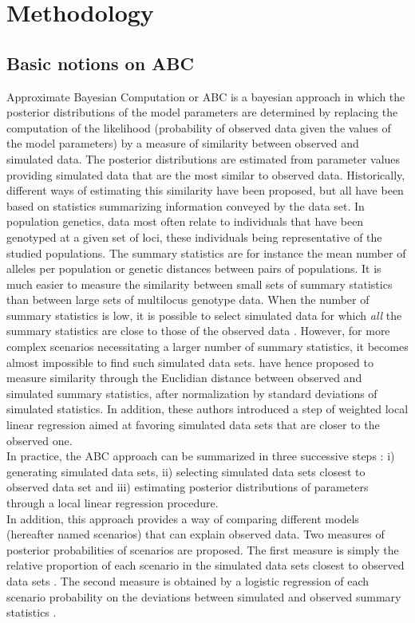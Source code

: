 \section{Methodology}
\subsection{Basic notions on ABC} Approximate Bayesian Computation or
ABC is a bayesian approach in which the posterior distributions of
the model parameters are determined by replacing the computation of
the likelihood (probability of observed data given the values of the
model parameters) by a measure of similarity between observed and
simulated data. The posterior distributions are estimated from
parameter values providing simulated data that are the most similar
to observed data. Historically, different ways of estimating this
similarity have been proposed, but all have been based on statistics
summarizing information conveyed by the data set. In population
genetics, data most often relate to individuals that have been
genotyped at a given set of loci, these individuals being representative of the
studied populations. The summary statistics are for instance the mean
number of alleles per population or genetic distances between pairs
of populations. It is much easier to measure the
similarity between small sets of summary statistics than between
large sets of multilocus genotype data. When the number of summary
statistics is low, it is possible to select simulated data for which
\emph{all} the summary statistics are close to those of the observed
data \citep{P1999,E2001,EC2003}. However, for more complex scenarios
necessitating a larger number of summary statistics, it becomes
almost impossible to find such simulated data sets. \citet{B2002}
have hence proposed to measure similarity through the Euclidian
distance between observed and simulated summary statistics, after normalization by standard
deviations of simulated statistics. In addition, these authors introduced a
step of weighted local linear regression aimed at favoring simulated data
sets that are closer to the observed one.\\
 In practice, the ABC approach can be summarized in three successive
 steps \citep{Ex2005} : i) generating simulated data sets, ii)
 selecting simulated data sets closest to observed data set and iii)
 estimating posterior distributions of parameters through a local
 linear regression procedure.\\ 
 In addition, this approach provides a way of comparing different
 models (hereafter named scenarios) that can explain observed data. Two measures of posterior probabilities of scenarios are proposed. The first measure is simply the relative proportion of each scenario in the simulated data sets closest to observed data sets \citep{ME2005,PC2007}. The second measure  is obtained by a logistic regression of each scenario probability on the deviations between simulated and observed summary statistics \citep{FR2007,B2008}. \\
 
